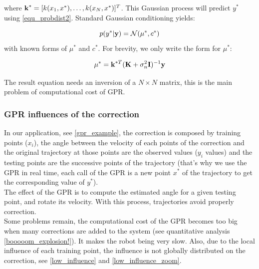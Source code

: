 where $\boldsymbol{\mathbf{k}}^* = [k(x_1, x^*), \hdots, k(x_N, x^*)]^T$. This Gaussian process will predict $y^*$ using \autoref{equ_probdist2}. Standard Gaussian conditioning yields:

\begin{equation}
  \label{equ_GPR}
  p(y^* | \boldsymbol{\mathbf{y}}) =  \mathcal{N}(\mu^*, c^*)
\end{equation}
with known forms of $\mu^*$ and $c^*$. For brevity, we only write the form for $ \mu^*$:

\begin{equation}
  \label{equ_mustrar}
  \mu^* = \boldsymbol{\mathbf{k}}^{*T}(\boldsymbol{\mathbf{{K}}} + \sigma_n^2 \boldsymbol{\mathbf{{I}}})^{-1}\boldsymbol{\mathbf{y}}
\end{equation}

The result equation needs an inversion of a $N \times N$ matrix, this is the main problem of computational cost of GPR.

\subsubsection{GPR influences of the correction}

In our application, see \autoref{gpr_example}, the correction is composed by training points ($x_i$), the angle between the velocity of each points of the correction and the original trajectory at those points are the observed values ($y_i$ values) and the testing points are the successive points of the trajectory (that's why we use the GPR in real time, each call of the GPR is a new point $x^*$ of the trajectory to get the corresponding value of $y^*$).\\ The effect of the GPR is to compute the estimated angle for a given testing point, and rotate its velocity. With this process, trajectories avoid properly correction.\\
Some problems remain, the computational cost of the GPR becomes too big when many corrections are added to the system (see quantitative analysis \autoref{booooom_explosion!}). It makes the robot being very slow. Also, due to the local influence of each training point, the influence is not globally distributed on the correction, see \autoref{low_influence} and \autoref{low_influence_zoom}.

